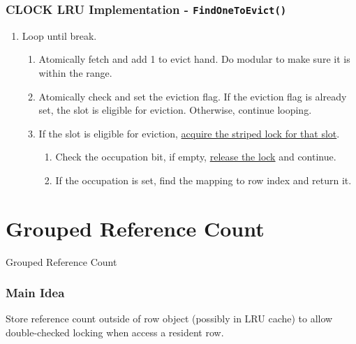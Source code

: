 \documentclass{beamer}
\begin{document}
\begin{frame}
\frametitle{CLOCK LRU Implementation - \texttt{FindOneToEvict()}}

\begin{enumerate}
\item Loop until break.
\begin{enumerate}
\item Atomically fetch and add 1 to evict hand. Do modular to make sure it is 
  within the range.
\item Atomically check and set the eviction flag. If the eviction flag is already 
set, the slot is eligible for eviction. Otherwise, continue looping.
\item If the slot is eligible for eviction, \underline{acquire the striped lock 
for that slot}.
\begin{enumerate}
\item Check the occupation bit, if empty, \underline{release the lock} and continue.
\item If the occupation is set, find the mapping to row index and return it.
\end{enumerate}
\end{enumerate}
\end{enumerate}
\end{frame}

\begin{frame}
\frametitle{}
\end{frame}


\section{Grouped Reference Count}

\begin{frame}
Grouped Reference Count
\end{frame}


\begin{frame}
\frametitle{Main Idea}

Store reference count outside of row object (possibly in LRU cache) to allow 
double-checked locking when access a resident row.

\end{frame}
\end{document}
